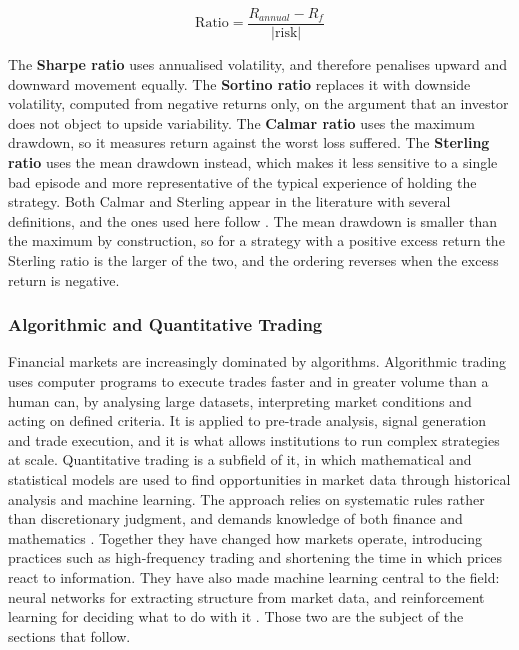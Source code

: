 \begin{equation}
\text{Ratio} = \frac{R_{annual} - R_f}{\left| \text{risk} \right|}
\label{Equation:RiskRatio}
\end{equation}

The \textbf{Sharpe ratio} \cite{sharpe_sharpe_1994} uses annualised volatility, and therefore penalises upward and downward movement equally. The \textbf{Sortino ratio} \cite{sortino_performance_1994} replaces it with downside volatility, computed from negative returns only, on the argument that an investor does not object to upside variability. The \textbf{Calmar ratio} uses the maximum drawdown, so it measures return against the worst loss suffered. The \textbf{Sterling ratio} uses the mean drawdown instead, which makes it less sensitive to a single bad episode and more representative of the typical experience of holding the strategy. Both Calmar and Sterling appear in the literature with several definitions, and the ones used here follow \cite{bacon_practical_2023}. The mean drawdown is smaller than the maximum by construction, so for a strategy with a positive excess return the Sterling ratio is the larger of the two, and the ordering reverses when the excess return is negative.

\subsubsection{Algorithmic and Quantitative Trading}

Financial markets are increasingly dominated by algorithms. Algorithmic trading uses computer programs to execute trades faster and in greater volume than a human can, by analysing large datasets, interpreting market conditions and acting on defined criteria. It is applied to pre-trade analysis, signal generation and trade execution, and it is what allows institutions to run complex strategies at scale. Quantitative trading is a subfield of it, in which mathematical and statistical models are used to find opportunities in market data through historical analysis and machine learning. The approach relies on systematic rules rather than discretionary judgment, and demands knowledge of both finance and mathematics \cite{chan_quantitative_2021}. Together they have changed how markets operate, introducing practices such as high-frequency trading and shortening the time in which prices react to information. They have also made machine learning central to the field: neural networks for extracting structure from market data, and reinforcement learning for deciding what to do with it \cite{jansen_machine_2020}. Those two are the subject of the sections that follow.